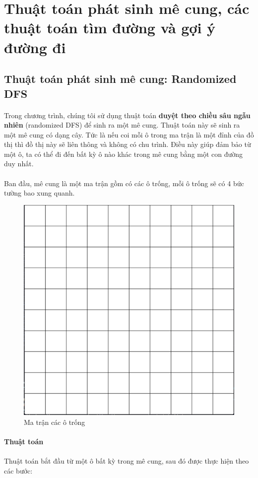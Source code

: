 \newpage
\section{Thuật toán phát sinh mê cung, các thuật toán tìm đường và gợi ý đường đi}


\subsection{Thuật toán phát sinh mê cung: Randomized DFS} 

\paragraph{}{Trong chương trình, chúng tôi sử dụng thuật toán \textbf{duyệt theo chiều sâu ngẫu nhiên} (randomized DFS) \cite{randomizeddfs} để sinh ra một mê cung. Thuật toán này sẽ sinh ra một mê cung có dạng cây. Tức là nếu coi mỗi ô trong ma trận là một đỉnh của đồ thị thì đồ thị này sẽ liên thông và không có chu trình. Điều này giúp đảm bảo từ một ô, ta có thể đi đến bất kỳ ô nào khác trong mê cung bằng một con đường duy nhất.}

\paragraph{}{Ban đầu, mê cung là một ma trận gồm có các ô trống, mỗi ô trống sẽ có 4 bức tường bao xung quanh.}

\begin{figure}[H]
    \centering
    \includegraphics[width=0.3\linewidth]{img/init-maze-1.png}
    \caption{Ma trận các ô trống}
    \label{fig:init-maze-1}
\end{figure}

\paragraph{Thuật toán}
\paragraph{}{Thuật toán bắt đầu từ một ô bất kỳ trong mê cung, sau đó được thực hiện theo các bước:}

